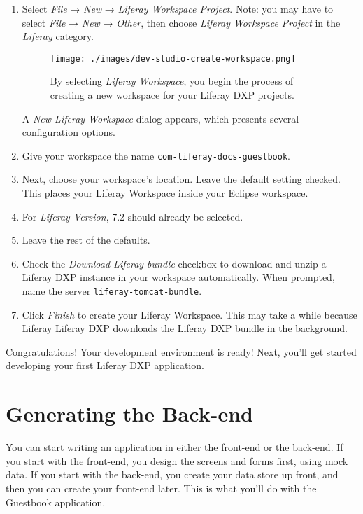 \begin{enumerate}
\def\labelenumi{\arabic{enumi}.}
\item
  Select \emph{File} → \emph{New} → \emph{Liferay Workspace Project}.
  Note: you may have to select \emph{File} → \emph{New} → \emph{Other},
  then choose \emph{Liferay Workspace Project} in the \emph{Liferay}
  category.

  \begin{figure}
  \centering
  \texttt{[image: ./images/dev-studio-create-workspace.png]}
  \caption{By selecting \emph{Liferay Workspace}, you begin the process
  of creating a new workspace for your Liferay DXP projects.}
  \end{figure}

  A \emph{New Liferay Workspace} dialog appears, which presents several
  configuration options.
\item
  Give your workspace the name \texttt{com-liferay-docs-guestbook}.
\item
  Next, choose your workspace's location. Leave the default setting
  checked. This places your Liferay Workspace inside your Eclipse
  workspace.
\item
  For \emph{Liferay Version}, 7.2 should already be selected.
\item
  Leave the rest of the defaults.
\item
  Check the \emph{Download Liferay bundle} checkbox to download and
  unzip a Liferay DXP instance in your workspace automatically. When
  prompted, name the server \texttt{liferay-tomcat-bundle}.
\item
  Click \emph{Finish} to create your Liferay Workspace. This may take a
  while because Liferay Liferay DXP downloads the Liferay DXP bundle in
  the background.
\end{enumerate}

Congratulations! Your development environment is ready! Next, you'll get
started developing your first Liferay DXP application.

\chapter{Generating the Back-end}\label{generating-the-back-end}

You can start writing an application in either the front-end or the
back-end. If you start with the front-end, you design the screens and
forms first, using mock data. If you start with the back-end, you create
your data store up front, and then you can create your front-end later.
This is what you'll do with the Guestbook application.

